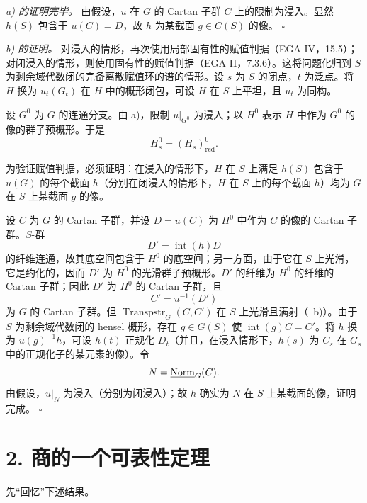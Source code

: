 \smallskip
\noindent\textit{ a) 的证明完毕。}
由假设，\(u\) 在 \(G\) 的 Cartan 子群 \(C\) 上的限制为浸入。显然 \(h(S)\) 包含于 \(u(C)=D\)，故 \(h\) 为某截面 \(g\in C(S)\) 的像。
\hfill\(\square\)

\medskip
\noindent\textit{ b) 的证明。}
对浸入的情形，再次使用局部固有性的赋值判据（EGA IV，15.5）；对闭浸入的情形，则使用固有性的赋值判据（EGA II，7.3.6）。这将问题化归到 \(S\) 为剩余域代数闭的完备离散赋值环的谱的情形。设 \(s\) 为 \(S\) 的闭点，\(t\) 为泛点。将 \(H\) 换为 \(u_t(G_t)\) 在 \(H\) 中的概形闭包，可设 \(H\) 在 \(S\) 上平坦，且 \(u_t\) 为同构。

设 \(G^0\) 为 \(G\) 的连通分支。由  a)，限制 \(u|_{G^0}\) 为浸入；以 \(H^0\) 表示 \(H\) 中作为 \(G^0\) 的像的群子预概形。于是
\[
  H_s^0=(H_s)_{\mathrm{red}}^0.
\]

为验证赋值判据，必须证明：在浸入的情形下，\(H\) 在 \(S\) 上满足 \(h(S)\) 包含于 \(u(G)\) 的每个截面 \(h\)（分别在闭浸入的情形下，\(H\) 在 \(S\) 上的每个截面 \(h\)）均为 \(G\) 在 \(S\) 上某截面 \(g\) 的像。

设 \(C\) 为 \(G\) 的 Cartan 子群，并设 \(D=u(C)\) 为 \(H^0\) 中作为 \(C\) 的像的 Cartan 子群。\(S\)-群
\[
  D'=\operatorname{int}(h)D
\]
的纤维连通，故其底空间包含于 \(H^0\) 的底空间；另一方面，由于它在 \(S\) 上光滑，它是约化的，因而 \(D'\) 为 \(H^0\) 的光滑群子预概形。\(D'\) 的纤维为 \(H^0\) 的纤维的 Cartan 子群；因此 \(D'\) 为 \(H^0\) 的 Cartan 子群，且
\[
  C'=u^{-1}(D')
\]
为 \(G\) 的 Cartan 子群。但 \(\operatorname{Transpstr}_G(C,C')\) 在 \(S\) 上光滑且满射（~b)）。由于 \(S\) 为剩余域代数闭的 hensel 概形，存在 \(g\in G(S)\) 使 \(\operatorname{int}(g)C=C'\)。将 \(h\) 换为 \(u(g)^{-1}h\)，可设 \(h(t)\) 正规化 \(D_t\)（并且，在浸入情形下，\(h(s)\) 为 \(C_s\) 在 \(G_s\) 中的正规化子的某元素的像）。令
\[
  N=\underline{\operatorname{Norm}}_G(C).
\]
由假设，\(u|_N\) 为浸入（分别为闭浸入）；故 \(h\) 确实为 \(N\) 在 \(S\) 上某截面的像，证明完成。
\hfill\(\square\)

%
\section*{2. 商的一个可表性定理}

先“回忆”下述结果。

